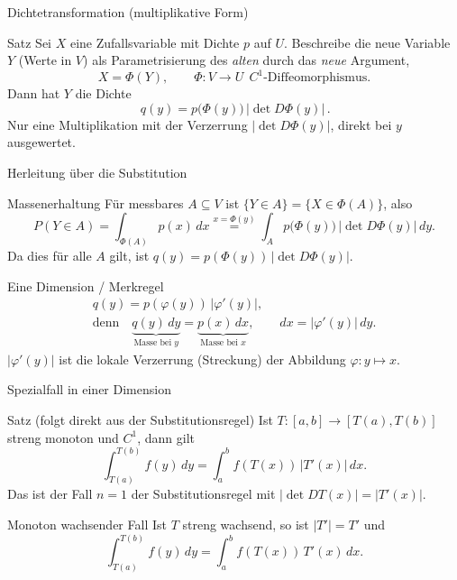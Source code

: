 \documentclass{beamer}
\begin{document}
\begin{frame}{Dichtetransformation (multiplikative Form)}
\begin{block}{Satz}
Sei \(X\) eine Zufallsvariable mit Dichte \(p\) auf \(U\). Beschreibe die neue Variable \(Y\) (Werte in \(V\)) als Parametrisierung des \emph{alten} durch das \emph{neue} Argument,
\[
X=\Phi(Y),\qquad \Phi\colon V\to U\ \ C^1\text{-Diffeomorphismus}.
\]
Dann hat \(Y\) die Dichte
\[
\boxed{\,q(y)=p\bigl(\Phi(y)\bigr)\,\bigl|\det D\Phi(y)\bigr|\,}.
\]
Nur eine Multiplikation mit der Verzerrung \(|\det D\Phi(y)|\), direkt bei \(y\) ausgewertet.
\end{block}
\end{frame}

\begin{frame}{Herleitung über die Substitution}
\begin{block}{Massenerhaltung}
Für messbares \(A\subseteq V\) ist \(\{Y\in A\}=\{X\in\Phi(A)\}\), also
\[
P(Y\in A)=\int_{\Phi(A)} p(x)\,dx
\overset{x=\Phi(y)}{=}\int_A p\bigl(\Phi(y)\bigr)\,|\det D\Phi(y)|\,dy.
\]
Da dies für alle \(A\) gilt, ist \(q(y)=p(\Phi(y))\,|\det D\Phi(y)|\).
\end{block}
\begin{block}{Eine Dimension / Merkregel}
\[
\begin{gathered}
q(y)=p(\varphi(y))\,|\varphi'(y)|,\\[2pt]
\text{denn}\quad
\underbrace{q(y)\,dy}_{\text{Masse bei }y}=\underbrace{p(x)\,dx}_{\text{Masse bei }x},\qquad dx=|\varphi'(y)|\,dy.
\end{gathered}
\]
\(|\varphi'(y)|\) ist die lokale Verzerrung (Streckung) der Abbildung \(\varphi\colon y\mapsto x\).
\end{block}
\end{frame}

\begin{frame}{Spezialfall in einer Dimension}
\begin{block}{Satz (folgt direkt aus der Substitutionsregel)}
Ist \(T\colon [a,b]\to[T(a),T(b)]\) streng monoton und \(C^1\), dann gilt
\[
\int_{T(a)}^{T(b)} f(y)\,dy
=
\int_a^b f(T(x))\,|T'(x)|\,dx.
\]
Das ist der Fall \(n=1\) der Substitutionsregel mit \(|\det DT(x)|=|T'(x)|\).
\end{block}

\begin{block}{Monoton wachsender Fall}
Ist \(T\) streng wachsend, so ist \(|T'|=T'\) und
\[
\int_{T(a)}^{T(b)} f(y)\,dy
=
\int_a^b f(T(x))\,T'(x)\,dx.
\]
\end{block}
\end{frame}
\end{document}
